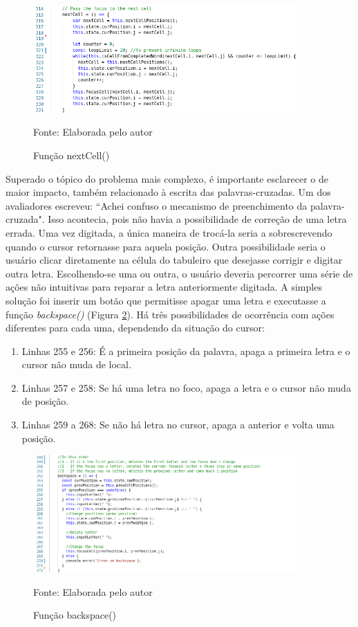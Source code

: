 \begin{figure}[H]
\centering
    \caption{Função nextCell()}
    \label{fig:nextcell}
    \includegraphics[width=0.9\textwidth]{Figuras/codeNextCell.png}
    
    Fonte: Elaborada pelo autor
\end{figure}



Superado o tópico do problema mais complexo, é importante esclarecer o de maior impacto, também relacionado à escrita das palavras-cruzadas.
Um dos avaliadores escreveu: ``Achei confuso o mecanismo de preenchimento da palavra-cruzada". Isso acontecia, pois não havia a possibilidade de correção de uma letra errada. Uma vez digitada, a única maneira de trocá-la seria a sobrescrevendo quando o cursor retornasse para aquela posição. Outra possibilidade seria o usuário clicar diretamente na célula do tabuleiro que desejasse corrigir e digitar outra letra. Escolhendo-se uma ou outra, o usuário deveria percorrer uma série de ações não intuitivas para reparar a letra anteriormente digitada. A simples solução foi inserir um botão que permitisse apagar uma letra e executasse a função \textit{backspace()} (Figura \ref{fig:backspace}). Há três possibilidades de ocorrência com ações diferentes para cada uma, dependendo da situação do cursor:
\begin{enumerate}
    \item Linhas 255 e 256: É a primeira posição da palavra, apaga a primeira letra e o cursor não muda de local.
    \item Linhas 257 e 258: Se há uma letra no foco, apaga a letra e o cursor não muda de posição.
    \item Linhas 259 a 268: Se não há letra no cursor, apaga a anterior e volta uma posição.
\end{enumerate}

\begin{figure}[H]
\centering
    \caption{Função backspace()}
    \label{fig:backspace}
    \includegraphics[width=0.9\textwidth]{Figuras/codeBackspace.png}
    
    Fonte: Elaborada pelo autor
\end{figure}

